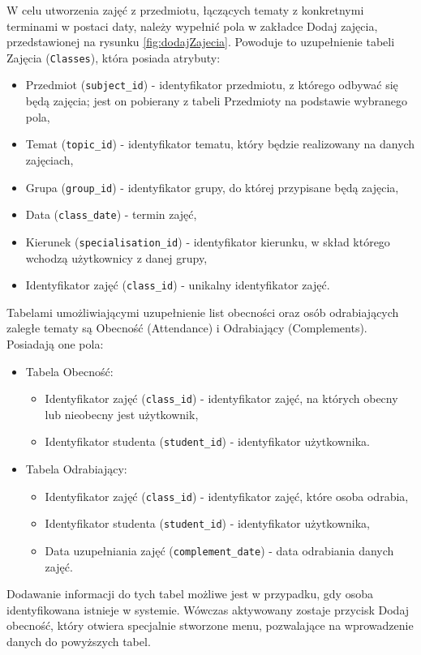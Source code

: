 W celu utworzenia zajęć z przedmiotu, łączących tematy z konkretnymi terminami w postaci daty, należy wypełnić pola w zakładce Dodaj zajęcia, przedstawionej na rysunku \ref{fig:dodajZajecia}. Powoduje to uzupełnienie tabeli Zajęcia (\verb!Classes!), która posiada atrybuty:
\begin{itemize}
\item Przedmiot (\verb!subject_id!) - identyfikator przedmiotu, z którego odbywać się będą zajęcia; jest on pobierany z tabeli Przedmioty na podstawie wybranego pola,
\item Temat (\verb!topic_id!) - identyfikator tematu, który będzie realizowany na danych zajęciach,
\item Grupa (\verb!group_id!) - identyfikator grupy, do której przypisane będą zajęcia,
\item Data (\verb!class_date!) - termin zajęć,
\item Kierunek (\verb!specialisation_id!) - identyfikator kierunku, w skład którego wchodzą użytkownicy z danej grupy,
\item Identyfikator zajęć (\verb!class_id!) - unikalny identyfikator zajęć.
\end{itemize}
Tabelami umożliwiającymi uzupełnienie list obecności oraz osób odrabiających zaległe tematy są Obecność (Attendance) i Odrabiający (Complements). Posiadają one pola:
\begin{itemize}
\item Tabela Obecność:
\begin{itemize}
\item Identyfikator zajęć (\verb!class_id!) - identyfikator zajęć, na których obecny lub nieobecny jest użytkownik,
\item Identyfikator studenta (\verb!student_id!) - identyfikator użytkownika.
\end{itemize}
\item Tabela Odrabiający:
\begin{itemize}
\item Identyfikator zajęć (\verb!class_id!) - identyfikator zajęć, które osoba odrabia,
\item Identyfikator studenta (\verb!student_id!) - identyfikator użytkownika,
\item Data uzupełniania zajęć (\verb!complement_date!) - data odrabiania danych zajęć.
\end{itemize}
\end{itemize}

Dodawanie informacji do tych tabel możliwe jest w przypadku, gdy osoba identyfikowana istnieje w systemie. Wówczas aktywowany zostaje przycisk Dodaj obecność, który otwiera specjalnie stworzone menu, pozwalające na wprowadzenie danych do powyższych tabel.

